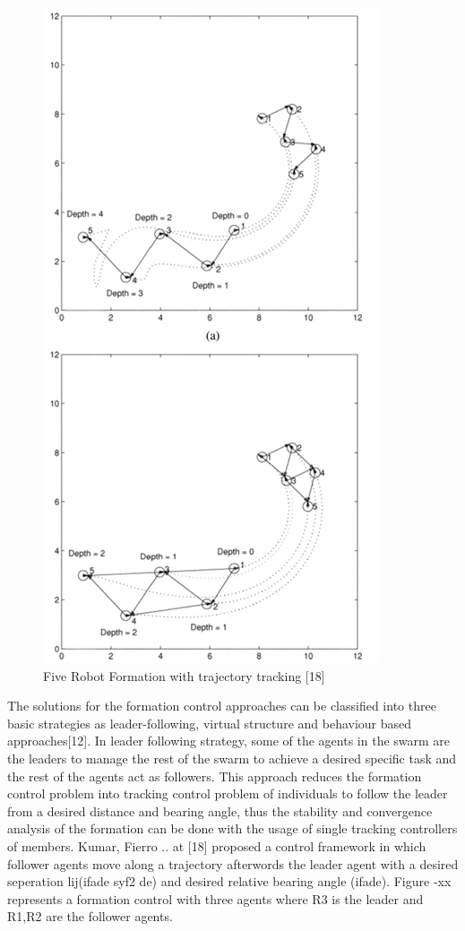 \documentclass[twoside]{article}
\begin{document}
\begin{figure}[H]
	\caption{Five Robot Formation with trajectory tracking [18]}
	\centering
	\includegraphics[scale = 1]{kumar}
\end{figure} 

The solutions for the formation control approaches can be classified into three basic strategies as leader-following, virtual structure and behaviour based approaches[12].  In leader following strategy, some of the agents in the swarm are the leaders to manage the rest of the swarm to achieve a desired specific task and the rest of the agents act as followers. This approach reduces the formation control problem into tracking control problem of individuals to follow the leader from a desired distance and bearing angle, thus the stability and convergence analysis of the formation can be done with the usage of single tracking controllers of members. Kumar, Fierro .. at [18] proposed a control framework in which follower agents move along a trajectory afterwords the leader agent with a desired seperation lij(ifade syf2 de) and desired relative bearing angle (ifade).  Figure -xx represents a formation control with three agents where R3 is the leader and R1,R2 are the follower agents. 
\end{document}
